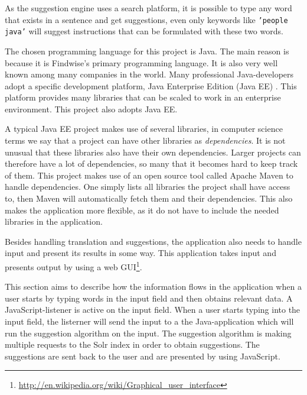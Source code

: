 As the suggestion engine uses a search platform, it is possible to type any word that exists in a sentence and get suggestions, even only keywords like \texttt{'people java'} will suggest instructions that can be formulated with these two words.

The chosen programming language for this project is Java. The main reason is because it is Findwise's primary programming language. It is also very well known among many companies in the world.
Many professional Java-developers adopt a specific development platform, Java Enterprise Edition (Java EE) \cite{javaee}. This platform provides many libraries that can be scaled to work in an enterprise environment. This project also adopts Java EE.

A typical Java EE project makes use of several libraries, in computer science terms we say that a project can have other libraries as \emph{dependencies}. It is not unusual that these libraries also have their own dependencies. Larger projects can therefore have a lot of dependencies, so many that it becomes hard to keep track of them. This project makes use of an open source tool called Apache Maven \cite{books/daglib/0021697} to handle dependencies. One simply lists all libraries the project shall have access to, then Maven will automatically fetch them and their dependencies. This also makes the application more flexible, as it do not have to include the needed libraries in the application.

Besides handling translation and suggestions, the application also needs to handle input and present its results in some way. This application takes input and presents output by using a web GUI\footnote{\url{http://en.wikipedia.org/wiki/Graphical_user_interface}}.

This section aims to describe how the information flows in the application when a user starts by typing words in the input field and then obtains relevant data.
\newline
\newline
A JavaScript-listener is active on the input field. When a user starts typing into the input field, the listerner will send the input to a the Java-application which will run the suggestion algorithm on the input. The suggestion algorithm is making multiple requests to the Solr index in order to obtain suggestions. The suggestions are sent back to the user and are presented by using JavaScript.

